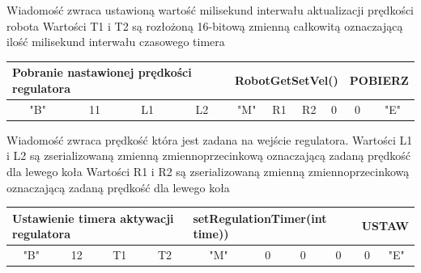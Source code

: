 \documentclass[eng,printmode]{mgr}
\begin{document}
Wiadomość zwraca ustawioną wartość milisekund interwału aktualizacji prędkości robota
Wartości T1 i T2 są rozłożoną 16-bitową zmienną całkowitą oznaczającą ilość milisekund interwału czasowego timera


\begin{table}[!htb]
\centering
\begin{adjustbox}{width=1\textwidth}
\label{my-label}
\begin{tabular}{|c|c|c|c|c|c|c|c|c|c|}
\hline
\multicolumn{4}{|l|}{Pobranie nastawionej prędkości regulatora  } & \multicolumn{4}{l|}{RobotGetSetVel()} & \multicolumn{2}{l|}{POBIERZ} \\ \hline
"B" \hspace{1em}             & 11\hspace{2em}              & L1\hspace{2em}              & L2\hspace{2em}         & "M"\hspace{2em}         & R1\hspace{2em}         & R2\hspace{2em}         & 0\hspace{2em}         & 0\hspace{2em}          & "E"\hspace{2em}          \\ \hline
\end{tabular}
\end{adjustbox}
\end{table}
Wiadomość zwraca prędkość która jest zadana na wejście regulatora. 
Wartości L1 i L2 są zserializowaną zmienną zmiennoprzecinkową oznaczającą zadaną prędkość dla lewego koła
Wartości R1 i R2 są zserializowaną zmienną zmiennoprzecinkową oznaczającą zadaną prędkość dla lewego koła 


\begin{table}[!htb]
\centering
\begin{adjustbox}{width=1\textwidth}
\label{my-label}
\begin{tabular}{|c|c|c|c|c|c|c|c|c|c|}
\hline
\multicolumn{4}{|l|}{Ustawienie timera aktywacji regulatora } & \multicolumn{4}{l|}{setRegulationTimer(int time))} & \multicolumn{2}{l|}{USTAW} \\ \hline
"B" \hspace{1em}             & 12\hspace{2em}              & T1\hspace{2em}              & T2\hspace{2em}         & "M"\hspace{2em}         & 0\hspace{2em}         & 0\hspace{2em}         & 0\hspace{2em}         & 0\hspace{2em}          & "E"\hspace{2em}          \\ \hline
\end{tabular}
\end{adjustbox}
\end{table}
\end{document}
